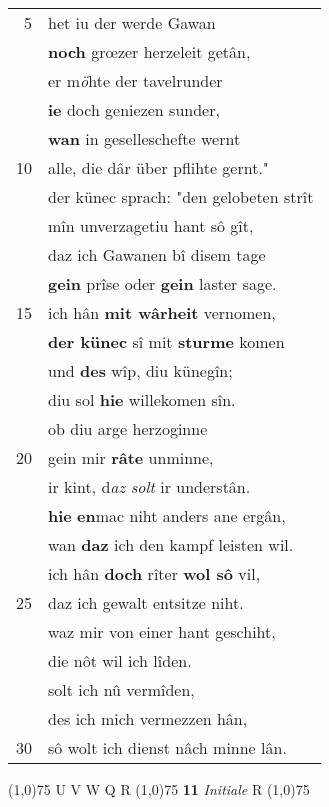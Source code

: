 \documentclass[8pt,a4paper,notitlepage]{article}
\begin{document}
\begin{table}[ht]
\begin{minipage}[t]{0.5\linewidth}
\begin{tabular}{rl}
5 & het iu der werde Gawan\\ 
 & \textbf{noch} grœzer herzeleit getân,\\ 
 & er m\textit{ö}hte der tavelrunder\\ 
 & \textbf{ie} doch geniezen sunder,\\ 
 & \textbf{wan} in geselleschefte wernt\\ 
10 & alle, die dâr über pflihte gernt."\\ 
 & der künec sprach: "den gelobeten strît\\ 
 & mîn unverzagetiu hant sô gît,\\ 
 & daz ich Gawanen bî disem tage\\ 
 & \textbf{gein} prîse oder \textbf{gein} laster sage.\\ 
15 & ich hân \textbf{mit wârheit} vernomen,\\ 
 & \textbf{der künec} sî mit \textbf{sturme} komen\\ 
 & und \textbf{des} wîp, diu künegîn;\\ 
 & diu sol \textbf{hie} willekomen sîn.\\ 
 & ob diu arge herzoginne\\ 
20 & gein mir \textbf{râte} unminne,\\ 
 & ir kint, d\textit{az solt} ir understân.\\ 
 & \textbf{hie} \textbf{en}mac niht anders ane ergân,\\ 
 & wan \textbf{daz} ich den kampf leisten wil.\\ 
 & ich hân \textbf{doch} rîter \textbf{wol sô} vil,\\ 
25 & daz ich gewalt entsitze niht.\\ 
 & waz mir von einer hant geschiht,\\ 
 & die nôt wil ich lîden.\\ 
 & solt ich nû vermîden,\\ 
 & des ich mich vermezzen hân,\\ 
30 & sô wolt ich dienst nâch minne lân.\\ 
\end{tabular}
\scriptsize
\line(1,0){75} \newline
U V W Q R \newline
\line(1,0){75} \newline
\textbf{11} \textit{Initiale} R  \newline
\line(1,0){75} \newline

\end{minipage}
\end{table}
\end{document}
